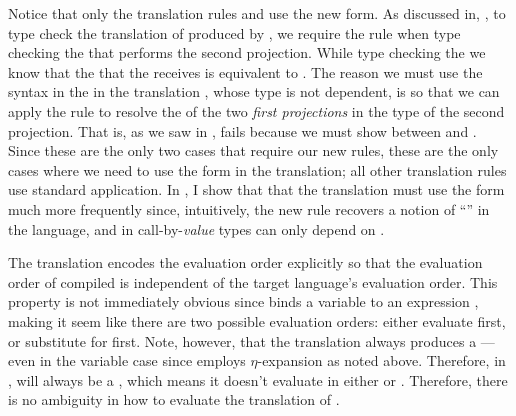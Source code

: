 Notice that only the translation rules  and  use the
new  form.
As discussed in, , to type check the translation of
\im{\ssnde{\se}} produced by , we require the rule
 when type checking the  that performs the
second projection.
While type checking the  we know that the  \im{\cpsy}
that the  receives is equivalent to
\im{\cpsncappe{\se^\div}{\cpsalpha}{\cpsidk}}.
The reason we must use the  syntax in the in the translation
, whose type is not dependent, is so that we can apply the
 rule to resolve the  of
the two \emph{first projections} in the type of the second projection.
That is, as we saw in ,  fails because
we must show  between \im{(\sfste{\se})^\div} and
\im{\cpsfste{\cpsy}}.
Since these are the only two cases that require our new rules, these are the
only cases where we need to use the  form in the translation;
all other translation rules use standard application.
In , I show that that the  translation must use
the  form much more frequently since, intuitively, the new
 rule recovers a notion of ``'' in the
 language, and in call-by-\emph{value} types can only depend on
.

The  translation encodes the  evaluation order explicitly so
that the evaluation order of compiled  is independent of the target
language's evaluation order.
This property is not immediately obvious since  binds a
variable \im{\cpsx} to an expression \im{\cpse}, making it seem like there are
two possible evaluation orders: either evaluate \im{\cpse} first, or substitute
\im{\cpse} for \im{\cpsx} first.
Note, however, that the  translation always produces a
\im{\tfontsym{\lambda}} ---even in the variable case since
 employs \(\eta\)-expansion as noted above.
Therefore, in , \im{\cpse} will always be a , which
means it doesn't evaluate in either  or .
Therefore, there is no ambiguity in how to evaluate the translation of
.

